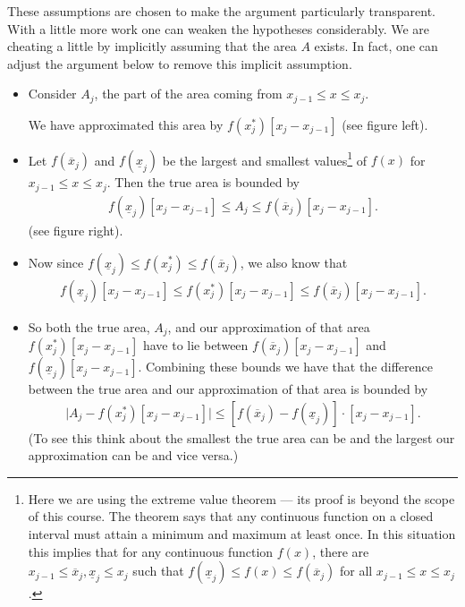 These assumptions are chosen to make the argument particularly transparent.
With
a little
more work one can weaken the hypotheses considerably. We are cheating a little
by
implicitly assuming that the area $A$ exists. In fact, one can adjust the
argument below
to remove this implicit assumption.
\begin{itemize}
 \item Consider $A_j$, the part of the area coming from $x_{j-1}\le x\le x_j$.%

We have approximated this area by $f(x_j^*)[x_j-x_{j-1}]$ (see figure left).

\item  Let $f({\overline x}_j)$ and
$f({\underline x}_j)$ be the largest and smallest values\footnote{Here we are
using the
extreme value theorem --- its proof is beyond the scope of this course. The
theorem says
that any continuous function on a closed interval must attain a minimum and
maximum at
least once. In this situation this implies that for any continuous function
$f(x)$,
there are $x_{j-1}\le {\overline x}_j, {\underline x}_j\le x_j$ such that
$f({\underline
x}_j)\le f(x) \le f({\overline x}_j)$ for all $x_{j-1}\le x\le x_j$.} of $f(x)$
for
$x_{j-1}\le x\le x_j$. Then the true area is bounded by
\begin{align*}
  f({\underline x}_j)[x_j-x_{j-1}] \leq
A_j \leq f({\overline x}_j)[x_j-x_{j-1}].
\end{align*}
(see figure right).

\item Now since $f({\underline x}_j) \leq f(x_j^*) \leq f({\overline x}_j)$, we
also know
that
\begin{align*}
  f({\underline x}_j)[x_j-x_{j-1}] \leq
f(x_j^*)[x_j-x_{j-1}] \leq f({\overline x}_j)[x_j-x_{j-1}].
\end{align*}
\item So both the true area, $A_j$, and our approximation of that area
$f(x_j^*)[x_j - x_{j-1}]$  have to lie between $f({\overline
x}_j)[x_j-x_{j-1}]$ and $f({\underline x}_j)[x_j-x_{j-1}]$. Combining these
bounds we have that the difference between the true area and our approximation
of that area is bounded by
\begin{align*}
\big|A_j-f(x_j^*)[x_j-x_{j-1}]\big|
\le[f({\overline x}_j)-f({\underline x}_j)]\cdot[x_j-x_{j-1}].
\end{align*}
(To see this think about the smallest the true area can be and the largest our
approximation can be and vice versa.)


\end{itemize}
